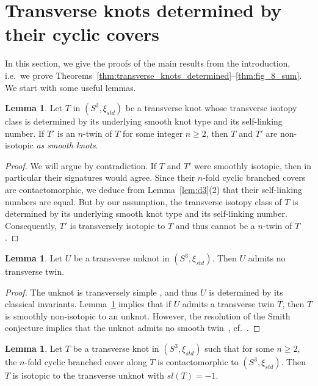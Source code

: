 \documentclass[11pt]{amsart}
\theoremstyle{definition}
\theoremstyle{definition}
\theoremstyle{definition}
\theoremstyle{definition}
\newtheorem{lemma}[theorem]{Lemma}
\begin{document}
\section{Transverse knots determined by their cyclic covers}
In this section, we give the proofs of the main results from the introduction, i.e.\ we prove Theorems~\ref{thm:transverse_knots_determined}--\ref{thm:fig_8_sum}. We start with some useful lemmas.

\begin{lemma}\label{lem:same_sl}
    Let $T$ in $(S^3,\xi_{std})$ be a transverse knot whose transverse isotopy class is determined by its underlying smooth knot type and its self-linking number. If $T'$ is an $n$-twin of $T$ for some integer $n\geq2$, then $T$ and $T'$ are non-isotopic \emph{as smooth knots}. 
\end{lemma}

\begin{proof}
We will argue by contradiction. If $T$ and $T'$ were smoothly isotopic, then in particular their signatures would agree. Since their $n$-fold cyclic branched covers are contactomorphic, we deduce from Lemma~\ref{lem:d3}(2) that their self-linking numbers are equal. But by our assumption, the transverse isotopy class of $T$ is determined by its underlying smooth knot type and its self-linking number. Consequently, $T'$ is transversely isotopic to $T$ and thus cannot be a  $n$-twin of $T$.
\end{proof}

\begin{lemma}\label{lem:unknot}
    Let $U$ be a transverse unknot in $(S^3,\xi_{std})$. Then $U$ admits no transverse twin.
\end{lemma}

\begin{proof}
    The unknot is transversely simple \cite{Eliashberg_transverse_unknots}, and thus $U$ is determined by its classical invariants. Lemma~\ref{lem:same_sl} implies that if $U$ admits a transverse twin $T$, then $T$ is smoothly non-isotopic to an unknot. However, the resolution of the Smith conjecture implies that the unknot admits no smooth twin~\cite{Zimmermann}, cf.\ \cite{Paoluzzi_survey}.
\end{proof}

\begin{lemma}\label{lem:S3}
    Let $T$ be a transverse knot in $(S^3,\xi_{std})$ such that for some $n\geq2$, the $n$-fold cyclic branched cover along $T$ is contactomorphic to $(S^3,\xi_{std})$. Then $T$ is isotopic to the transverse unknot with $sl(T)=-1$.
\end{lemma}
\end{document}
